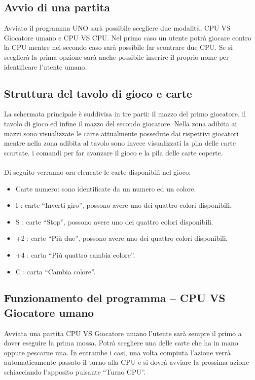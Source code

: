 	\subsection{Avvio di una partita}
		Avviato il programma UNO sarà possibile scegliere due modalità, CPU VS Giocatore umano e CPU VS CPU. Nel primo caso un utente potrà giocare contro la CPU mentre nel secondo caso sarà possibile far scontrare due CPU. 
		Se si sceglierà la prima opzione sarà anche possibile inserire il proprio nome per identificare l’utente umano.
	
	\subsection{Struttura del tavolo di gioco e carte}
		La schermata principale è suddivisa in tre parti: il mazzo del primo giocatore, il tavolo di gioco ed infine il mazzo del secondo giocatore. Nella zona adibita ai mazzi sono visualizzate le carte attualmente possedute dai rispettivi giocatori mentre nella zona adibita al tavolo sono invece visualizzati la pila delle carte scartate, i comandi per far avanzare il gioco e la pila delle carte coperte.\\\\
		
		Di seguito verranno ora elencate le carte disponibili nel gioco:
		\begin{itemize}
			\item Carte numero: sono identificate da un numero ed un colore.
			\item I : carte ``Inverti giro'', possono avere uno dei quattro colori disponibili.
			\item S : carte ``Stop'', possono avere uno dei quattro colori disponibili.
			\item +2 : carte ``Più due'', possono avere uno dei quattro colori disponibili.
			\item +4 : carta ``Più quattro cambia colore''.
			\item C : carta ``Cambia colore''.
		\end{itemize}
		
	\subsection{Funzionamento del programma – CPU VS Giocatore umano}
		Avviata una partita CPU VS Giocatore umano l’utente sarà sempre il primo a dover eseguire la prima mossa. Potrà scegliere una delle carte che ha in mano oppure pescarne una. In entrambe i casi, una volta compiuta l’azione verrà automaticamente passato il turno alla CPU e si dovrà avviare la prossima azione schiacciando l’apposito pulsante “Turno CPU”.\\\\
		
